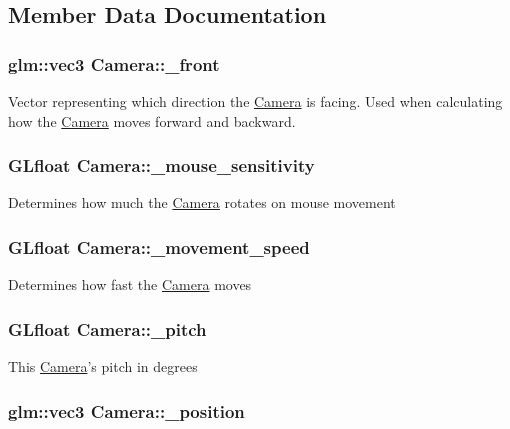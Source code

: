 \subsection{Member Data Documentation}
\hypertarget{classCamera_ac610e748840c4b70c9081c2d68df2e8d}{
\subsubsection[{\-\_\-front}]{\setlength{\rightskip}{0pt plus 5cm}glm\-::vec3 Camera\-::\-\_\-front}}\label{classCamera_ac610e748840c4b70c9081c2d68df2e8d}
Vector representing which direction the \hyperlink{classCamera}{Camera} is facing. Used when calculating how the \hyperlink{classCamera}{Camera} moves forward and backward. \hypertarget{classCamera_aeb483d642e0bcf11aa881467ac9676fe}{
\subsubsection[{\-\_\-mouse\-\_\-sensitivity}]{\setlength{\rightskip}{0pt plus 5cm}G\-Lfloat Camera\-::\-\_\-mouse\-\_\-sensitivity}}\label{classCamera_aeb483d642e0bcf11aa881467ac9676fe}
Determines how much the \hyperlink{classCamera}{Camera} rotates on mouse movement \hypertarget{classCamera_a6f31b5658310866d3228614a755b59b0}{
\subsubsection[{\-\_\-movement\-\_\-speed}]{\setlength{\rightskip}{0pt plus 5cm}G\-Lfloat Camera\-::\-\_\-movement\-\_\-speed}}\label{classCamera_a6f31b5658310866d3228614a755b59b0}
Determines how fast the \hyperlink{classCamera}{Camera} moves \hypertarget{classCamera_a23a8b8859c44721d7082b89809318918}{
\subsubsection[{\-\_\-pitch}]{\setlength{\rightskip}{0pt plus 5cm}G\-Lfloat Camera\-::\-\_\-pitch}}\label{classCamera_a23a8b8859c44721d7082b89809318918}
This \hyperlink{classCamera}{Camera}'s pitch in degrees \hypertarget{classCamera_a0a931ed2051befaad1f482b3b5e98ca0}{
\subsubsection[{\-\_\-position}]{\setlength{\rightskip}{0pt plus 5cm}glm\-::vec3 Camera\-::\-\_\-position}}\label{classCamera_a0a931ed2051befaad1f482b3b5e98ca0}

